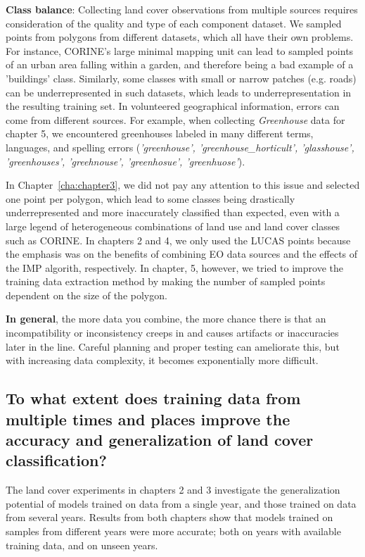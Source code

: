             \textbf{Class balance}: Collecting land cover observations from multiple sources requires consideration of the quality and type of each component dataset. We sampled points from polygons from different datasets, which all have their own problems. For instance, CORINE's large minimal mapping unit can lead to sampled points of an urban area falling within a garden, and therefore being a bad example of a 'buildings' class. Similarly, some classes with small or narrow patches (e.g. roads) can be underrepresented in such datasets, which leads to underrepresentation in the resulting training set. In volunteered geographical information, errors can come from different sources. For example, when collecting \textit{Greenhouse} data for chapter 5, we encountered greenhouses labeled in many different terms, languages, and spelling errors (\textit{'greenhouse', 'greenhouse\_horticult', 'glasshouse', 'greenhouses', 'greehnouse', 'greenhosue', 'greenhuose'}).

            In Chapter\@~\ref{cha:chapter3}, we did not pay any attention to this issue and selected one point per polygon, which lead to some classes being drastically underrepresented and more inaccurately classified than expected, even with a large legend of heterogeneous combinations of land use and land cover classes such as CORINE. In chapters 2 and 4, we only used the LUCAS points because the emphasis was on the benefits of combining EO data sources and the effects of the IMP algorith, respectively. In chapter, 5, however, we tried to improve the training data extraction method by making the number of sampled points dependent on the size of the polygon.

            \textbf{In general}, the more data you combine, the more chance there is that an incompatibility or inconsistency creeps in and causes artifacts or inaccuracies later in the line. Careful planning and proper testing can ameliorate this, but with increasing data complexity, it becomes exponentially more difficult.
            

    \subsection{To what extent does training data from multiple times and places improve the accuracy and generalization of land cover classification?}
    \label{syn:rq2}
    
        The land cover experiments in chapters 2 and 3 investigate the generalization potential of models trained on data from a single year, and those trained on data from several years. Results from both chapters show that models trained on samples from different years were more accurate; both on years with available training data, and on unseen years.

